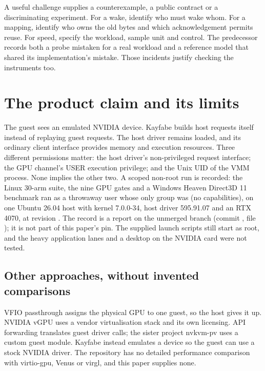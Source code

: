 A useful challenge supplies a counterexample, a public contract or a discriminating experiment.
For a wake, identify who must wake whom. For a mapping, identify who owns the old bytes and
which acknowledgement permits reuse. For speed, specify the workload, sample unit and control.
The predecessor records both a probe mistaken for a real workload and a reference model that
shared its implementation's mistake. Those incidents justify checking the instruments too.

\section{The product claim and its limits}

\doc The guest sees an emulated NVIDIA device. Kayfabe builds host requests itself instead of
replaying guest requests. The host driver remains loaded, and its ordinary client interface
provides memory and execution resources. Three different permissions matter: the host driver's
non-privileged request interface; the GPU channel's USER execution privilege; and the Unix UID
of the VMM process. None implies the other two. A scoped non-root run is recorded: the Linux 30-arm suite, the nine GPU gates and a
Windows Heaven Direct3D 11 benchmark ran as a throwaway user whose only group was 
(no capabilities), on one Ubuntu 26.04 host with kernel 7.0.0-34, host driver 595.91.07 and an
RTX 4070, at revision . The record is a report on the unmerged branch
 (commit , file
); it is not part of this paper's pin. The
supplied launch scripts still start as root, and the heavy application lanes and a desktop on
the NVIDIA card were not tested.

\subsection{Other approaches, without invented comparisons}

\doc VFIO passthrough assigns the physical GPU to one guest, so the host gives it up.
NVIDIA vGPU uses a vendor virtualisation stack and its own licensing. API forwarding translates
guest driver calls; the sister project nvkvm-pv uses a custom guest module. Kayfabe instead
emulates a device so the guest can use a stock NVIDIA driver. The repository has no detailed
performance comparison with virtio-gpu, Venus or virgl, and this paper supplies none.

